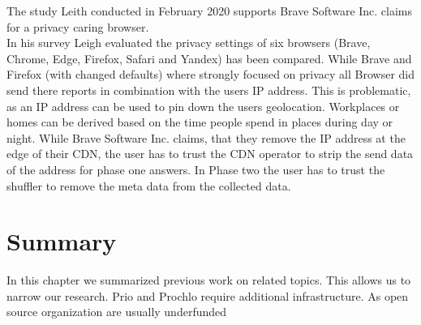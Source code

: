         The study Leith conducted in February 2020 \cite{leith_web_2020} supports Brave Software Inc. claims
        for a privacy caring browser.\\
        In his survey Leigh evaluated the privacy settings of six browsers (Brave, Chrome, Edge, Firefox, Safari and Yandex) has been compared. While Brave and Firefox (with changed defaults) where strongly focused on privacy all Browser did send there reports in combination with the users IP address\cite{leith_web_2020}.
        This is problematic, as an IP address can be used to pin down the users geolocation\cite{koch_geolocation_2013}. Workplaces or homes can be derived based on the time people spend in places during day or night. 
        While Brave Software Inc. claims, that they remove the IP address at the edge of their CDN, the user has to trust the CDN operator to strip the send data of the address for phase one answers. In Phase two the user has to trust the shuffler to remove the meta data from the collected data. 

\section{Summary}
    In this chapter we summarized previous work on related topics. This allows us to narrow our research.
    Prio and Prochlo require additional infrastructure. As open source organization are usually underfunded
%


  